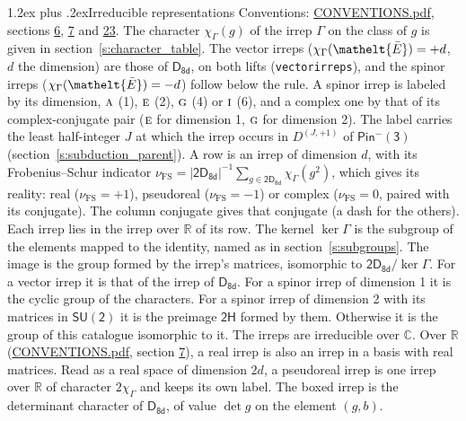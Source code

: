\documentclass[10pt,a4paper]{article}
\makeatletter
\renewcommand\section{\@startsection{section}{1}{\z@}{-3ex plus -1ex minus -.2ex}%
  {1.2ex plus .2ex}{\normalfont\large\sffamily\bfseries\color{parttitle}}}
\numberwithin{equation}{section}
\newcommand{\eltfont}[1]{{\let\sigma\eltsigma\mathelt{#1}}}
\newcommand{\grp}[1]{\mathsf{#1}}
\newcommand{\irr}[1]{\text{\normalfont\scshape #1}}
\newcommand{\elt}[1]{\eltfont{#1}}
\newcommand{\irrJp}[2]{D^{(#1,#2)}}
\newcommand{\irchar}[1]{\chi_{#1}}
\newcommand{\fsind}{\nu_{\mathrm{FS}}}
\newcommand{\barred}[1]{\bar{#1}}
\makeatother
\begin{document}
\section{Irreducible representations}\label{s:irreps}
Conventions: \href{../../CONVENTIONS.pdf}{CONVENTIONS.pdf}, sections \href{../../../rotation/CONVENTIONS.pdf\#conv.6}{6}, \href{../../../rotation/CONVENTIONS.pdf\#conv.7}{7} and \href{../../CONVENTIONS.pdf\#conv.23}{23}.
\leavevmode\label{n:function.character}\label{n:irrep.Gamma}The character $\irchar{\Gamma}(g)$ of the irrep $\Gamma$ on the class of $g$ is given in section~\ref{s:character_table}. \label{n:index.dimension}The vector irreps ($\irchar{\Gamma}(\elt{\barred{E}}) = +d$, $d$ the dimension) are those of \href{../../../rotation/data/pdf/D8d.pdf}{$\grp{D_{8d}}$}, on both lifts (\texttt{vectorirreps}), and the spinor irreps ($\irchar{\Gamma}(\elt{\barred{E}}) = -d$) follow below the rule. A spinor irrep is labeled by its dimension, $\irr{a}$ (1), $\irr{e}$ (2), $\irr{g}$ (4) or $\irr{i}$ (6), and a complex one by that of its complex-conjugate pair ($\irr{e}$ for dimension 1, $\irr{g}$ for dimension 2). The label carries the least half-integer $J$ at which the irrep occurs in $\irrJp{J}{+1}$ of $\grp{Pin^{-}(3)}$ (section~\ref{s:subduction_parent}).
\leavevmode\label{n:index.frobenius}\label{n:head.irrep}\label{n:head.reality}A row is an irrep of dimension $d$, with its Frobenius--Schur indicator $\fsind = |\grp{2D_{8d}}|^{-1}\allowbreak\sum_{g\in\grp{2D_{8d}}}\irchar{\Gamma}(g^2)$, which gives its reality: real ($\fsind = +1$), pseudoreal ($\fsind = -1$) or complex ($\fsind = 0$, paired with its conjugate). \label{n:head.conjugate}The column conjugate gives that conjugate (a dash for the others). \label{n:head.over.real}Each irrep lies in the irrep over $\mathbb{R}$ of its row. \label{n:head.kernel}The kernel $\ker\Gamma$ is the subgroup of the elements mapped to the identity, named as in section~\ref{s:subgroups}. \label{n:head.image}The image is the group formed by the irrep's matrices, isomorphic to $\grp{2D_{8d}}/\ker\Gamma$. For a vector irrep it is that of the irrep of \href{../../../rotation/data/pdf/D8d.pdf}{$\grp{D_{8d}}$}. For a spinor irrep of dimension 1 it is the cyclic group of the characters. For a spinor irrep of dimension 2 with its matrices in $\grp{SU(2)}$ it is the preimage $\grp{2H}$ formed by them. Otherwise it is the group of this catalogue isomorphic to it. The irreps are irreducible over $\mathbb{C}$. Over $\mathbb{R}$ (\href{../../CONVENTIONS.pdf}{CONVENTIONS.pdf}, section \href{../../../rotation/CONVENTIONS.pdf\#conv.7}{7}), a real irrep is also an irrep in a basis with real matrices. Read as a real space of dimension $2d$, a pseudoreal irrep is one irrep over $\mathbb{R}$ of character $2\irchar{\Gamma}$ and keeps its own label. \label{n:mark.determinant}The boxed irrep is the determinant character of \href{../../../rotation/data/pdf/D8d.pdf}{$\grp{D_{8d}}$}, of value $\det g$ on the element $(g, b)$.
\end{document}
